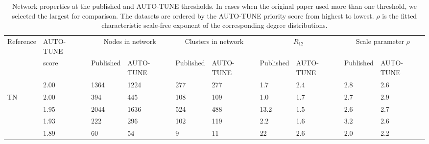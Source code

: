 \documentclass[utf8]{FrontiersinHarvard} %
\begin{document}
\begin{table}[h]
	\caption{Network properties at the published and AUTO-TUNE thresholds. In cases when the original paper used more than one threshold, we selected the largest for comparison. The datasets are ordered by the AUTO-TUNE priority score from highest to lowest. $\rho$ is the fitted characteristic scale-free exponent of the corresponding degree distributions.}
	\vspace{10pt}
	\centering
	\begin{ssmall}
		\label{tab:paperComparisonProp}
		\begin{tabular}{llllllllll}
			\hline
			Reference                        & AUTO-TUNE & \multicolumn{2}{c}{Nodes in network} & \multicolumn{2}{c}{Clusters in network} & \multicolumn{2}{c}{$R_{12}$} & \multicolumn{2}{c}{Scale parameter $\rho$}                                                 \\
			                                 & score     & Published                            & AUTO-TUNE                               & Published                    & AUTO-TUNE                                  & Published & AUTO-TUNE & Published & AUTO-TUNE \\
			\hline
			\cite{Li:2022aa}                 & 2.00      & 1364                                 & 1224                                    & 277                          & 277                                        & 1.7       & 2.4       & 2.8       & 2.6       \\
			\cite{chato_public_2020} TN      & 2.00      & 394                                  & 445                                     & 108                          & 109                                        & 1.0       & 1.7       & 2.7       & 2.9       \\
			\cite{rhee_national_2019}        & 1.95      & 2044                                 & 1636                                    & 524                          & 488                                        & 13.2      & 1.5       & 2.6       & 2.7       \\
			\cite{bbosa_short_2020}          & 1.93      & 222                                  & 296                                     & 102                          & 119                                        & 2.2       & 1.6       & 3.2       & 2.6       \\
			\citet{dalai_combining_2018}     & 1.89      & 60                                   & 54                                      & 9                            & 11                                         & 22        & 2.6       & 2.0       & 2.2       \\ %

\end{tabular}
\end{ssmall}
\end{table}
\end{document}
